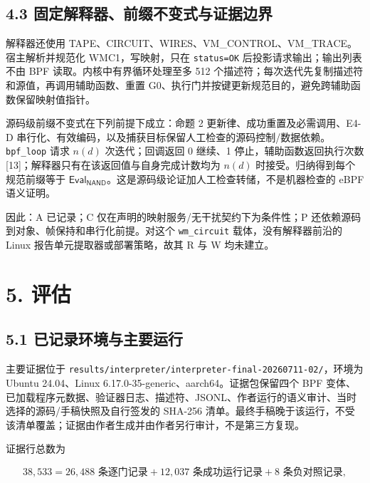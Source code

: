 \documentclass[
  11pt,
  a4paper,
]{ctexart}
\begin{document}
\hypertarget{43-ux56faux5b9aux89e3ux91caux5668ux524dux7f00ux4e0dux53d8ux5f0fux4e0eux8bc1ux636eux8fb9ux754c}{%
\subsection{4.3
固定解释器、前缀不变式与证据边界}\label{43-ux56faux5b9aux89e3ux91caux5668ux524dux7f00ux4e0dux53d8ux5f0fux4e0eux8bc1ux636eux8fb9ux754c}}

解释器还使用
TAPE、CIRCUIT、WIRES、VM\_CONTROL、VM\_TRACE。宿主解析并规范化
WMC1，写映射，只在 \texttt{status=OK} 后投影请求输出；输出列表不由 BPF
读取。内核中有界循环处理至多 512
个描述符；每次迭代先复制描述符和源值，再调用辅助函数、重置
G0、执行门并按键更新规范目的，避免跨辅助函数保留映射值指针。

源码级前缀不变式在下列前提下成立：命题 2
更新律、成功重置及必需调用、E4-D
串行化、有效编码，以及捕获目标保留人工检查的源码控制/数据依赖。\texttt{bpf\_loop}
请求 \(n(d)\) 次迭代；回调返回 0 继续、1 停止，辅助函数返回执行次数
{[}13{]}；解释器只有在该返回值与自身完成计数均为 \(n(d)\)
时接受。归纳得到每个规范前缀等于
\(\mathsf{Eval}_{\mathsf{NAND}}\)。这是源码级论证加人工检查转储，不是机器检查的
eBPF 语义证明。

因此：A 已记录；C 仅在声明的映射服务/无干扰契约下为条件性；P
还依赖源码到对象、帧保持和串行化前提。对这个 \texttt{wm\_circuit}
载体，没有解释器前沿的 Linux 报告单元提取器或部署策略，故其 R 与 W
均未建立。

\hypertarget{5-ux8bc4ux4f30}{%
\section{5. 评估}\label{5-ux8bc4ux4f30}}

\subsection{5.1 已记录环境与主要运行}\label{51-ux5df2ux8bb0ux5f55ux73afux5883ux4e0eux4e3bux8981ux8fd0ux884c}

主要证据位于
\texttt{results/interpreter/interpreter-final-20260711-02/}，环境为
Ubuntu 24.04、Linux 6.17.0-35-generic、aarch64。证据包保留四个 BPF
变体、已加载程序元数据、验证器日志、描述符、JSONL、作者运行的语义审计、当时选择的源码/手稿快照及自行签发的
SHA-256
清单。最终手稿晚于该运行，不受该清单覆盖；证据由作者生成并由作者另行审计，不是第三方复现。

证据行总数为

\[38{,}533=26{,}488\text{ 条逐门记录}+12{,}037\text{ 条成功运行记录}+8\text{ 条负对照记录},\]
\end{document}
